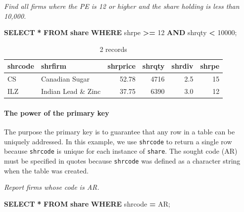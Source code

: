 \documentclass[
]{article}
\newenvironment{Shaded}{\begin{snugshade}}{\end{snugshade}}
\newcommand{\DecValTok}[1]{\textcolor[rgb]{0.00,0.00,0.81}{#1}}
\newcommand{\KeywordTok}[1]{\textcolor[rgb]{0.13,0.29,0.53}{\textbf{#1}}}
\newcommand{\NormalTok}[1]{#1}
\newcommand{\OperatorTok}[1]{\textcolor[rgb]{0.81,0.36,0.00}{\textbf{#1}}}
\newcommand{\StringTok}[1]{\textcolor[rgb]{0.31,0.60,0.02}{#1}}
\begin{document}
\emph{Find all firms where the PE is 12 or higher and the share holding is less than 10,000.}

\begin{Shaded}
\begin{Highlighting}[]
\KeywordTok{SELECT} \OperatorTok{*} \KeywordTok{FROM} \KeywordTok{share}
  \KeywordTok{WHERE}\NormalTok{ shrpe }\OperatorTok{\textgreater{}=} \DecValTok{12} \KeywordTok{AND}\NormalTok{ shrqty }\OperatorTok{\textless{}} \DecValTok{10000}\NormalTok{;}
\end{Highlighting}
\end{Shaded}

\begin{table}

\caption{\label{tab:unnamed-chunk-10}2 records}
\centering
\begin{tabular}[t]{l|l|r|r|r|r}
\hline
shrcode & shrfirm & shrprice & shrqty & shrdiv & shrpe\\
\hline
CS & Canadian Sugar & 52.78 & 4716 & 2.5 & 15\\
\hline
ILZ & Indian Lead \& Zinc & 37.75 & 6390 & 3.0 & 12\\
\hline
\end{tabular}
\end{table}

\hypertarget{the-power-of-the-primary-key}{%
\paragraph*{The power of the primary key}\label{the-power-of-the-primary-key}}

The purpose the primary key is to guarantee that any row in a table can be uniquely addressed. In this example, we use \texttt{shrcode} to return a single row because \texttt{shrcode} is unique for each instance of \texttt{share}. The sought code (AR) must be specified in quotes because \texttt{shrcode} was defined as a character string when the table was created.

\emph{Report firms whose code is AR.}

\begin{Shaded}
\begin{Highlighting}[]
\KeywordTok{SELECT} \OperatorTok{*} \KeywordTok{FROM} \KeywordTok{share} \KeywordTok{WHERE}\NormalTok{ shrcode }\OperatorTok{=} \StringTok{\textquotesingle{}AR\textquotesingle{}}\NormalTok{;}
\end{Highlighting}
\end{Shaded}
\end{document}
